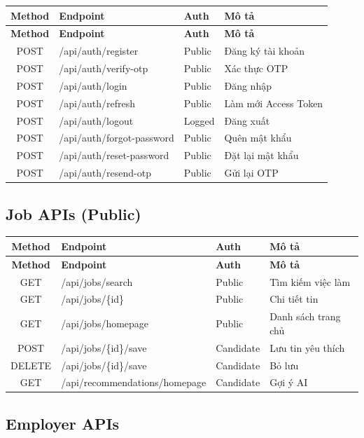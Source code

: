 \documentclass[12pt, a4paper]{report}
\begin{document}
\begin{longtable}{|c|p{5cm}|p{2cm}|p{4cm}|}
\hline
\textbf{Method} & \textbf{Endpoint} & \textbf{Auth} & \textbf{Mô tả} \\
\hline
\endfirsthead
\hline
\textbf{Method} & \textbf{Endpoint} & \textbf{Auth} & \textbf{Mô tả} \\
\hline
\endhead
POST & /api/auth/register & Public & Đăng ký tài khoản \\
\hline
POST & /api/auth/verify-otp & Public & Xác thực OTP \\
\hline
POST & /api/auth/login & Public & Đăng nhập \\
\hline
POST & /api/auth/refresh & Public & Làm mới Access Token \\
\hline
POST & /api/auth/logout & Logged & Đăng xuất \\
\hline
POST & /api/auth/forgot-password & Public & Quên mật khẩu \\
\hline
POST & /api/auth/reset-password & Public & Đặt lại mật khẩu \\
\hline
POST & /api/auth/resend-otp & Public & Gửi lại OTP \\
\hline
\end{longtable}

\subsection{Job APIs (Public)}

\begin{longtable}{|c|p{5cm}|p{2cm}|p{4cm}|}
\hline
\textbf{Method} & \textbf{Endpoint} & \textbf{Auth} & \textbf{Mô tả} \\
\hline
\endfirsthead
\hline
\textbf{Method} & \textbf{Endpoint} & \textbf{Auth} & \textbf{Mô tả} \\
\hline
\endhead
GET & /api/jobs/search & Public & Tìm kiếm việc làm \\
\hline
GET & /api/jobs/\{id\} & Public & Chi tiết tin \\
\hline
GET & /api/jobs/homepage & Public & Danh sách trang chủ \\
\hline
POST & /api/jobs/\{id\}/save & Candidate & Lưu tin yêu thích \\
\hline
DELETE & /api/jobs/\{id\}/save & Candidate & Bỏ lưu \\
\hline
GET & /api/recommendations/homepage & Candidate & Gợi ý AI \\
\hline
\end{longtable}

\subsection{Employer APIs}
\end{document}
